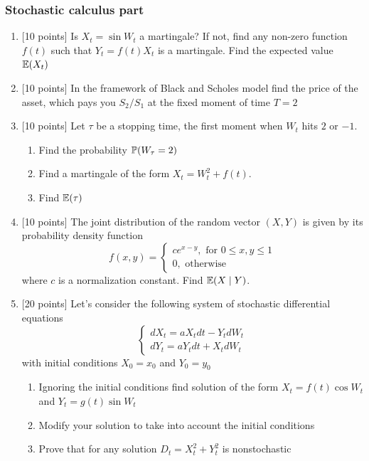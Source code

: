 \documentclass[pdftex,12pt,a4paper]{article}
\begin{document}
\subsubsection*{Stochastic calculus part}



\begin{enumerate}

\item $[$10 points] Is $X_t=\sin W_t$ a martingale? If not, find any non-zero function $f(t)$ such that $Y_t=f(t)X_t$ is a martingale. Find the expected value $\E(X_t)$

\item  $[$10 points] In the framework of Black and Scholes model find the price of the asset, which pays you $S_2/S_1$ at the fixed moment of time $T=2$

\item $[$10 points] Let $\tau$ be a stopping time, the first moment when $W_t$ hits $2$ or $-1$.
\begin{enumerate}
\item Find the probability $\P( W_{\tau} = 2)$
\item Find a martingale of the form $X_t=W_t^2+f(t)$.
\item Find $\E(\tau)$
\end{enumerate}

\item $[$10 points]  The joint distribution of the random vector $(X,Y)$ is given by its probability density function
\[
f(x,y)=
\left\{
  \begin{array}{l}
    c e^{x-y}, \text{ for } 0\leq x,y\leq 1 \\
    0, \text{ otherwise}    
  \end{array}
\right.
\]
where $c$ is a normalization constant. Find $\E(X\mid Y)$.

\item $[$20 points] Let’s consider the following system of stochastic differential equations
\[
\left\{
  \begin{array}{l}
    dX_t=aX_t dt-Y_t dW_t \\
    dY_t=aY_t dt+X_t dW_t
  \end{array}
\right.
\]
with initial conditions $X_0=x_0$ and $Y_0=y_0$ 
\begin{enumerate}
\item Ignoring the initial conditions find solution of the form $X_t=f(t)\cos W_t$ and $Y_t=g(t)\sin W_t$ 
\item Modify your solution to take into account the initial conditions
\item Prove that for any solution $D_t=X_t^2+Y_t^2$ is nonstochastic
\end{enumerate}

\end{enumerate}
\end{document}
